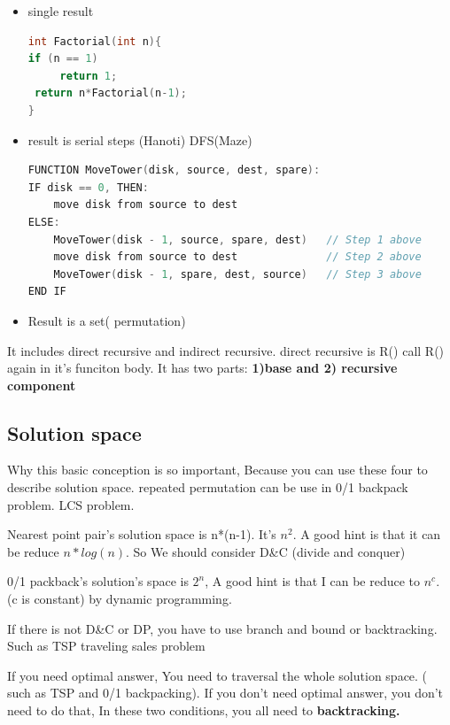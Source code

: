 \documentclass[a4paper,11pt,twoside]{book}
\begin{document}
\begin{itemize}
\item single result 
\begin{lstlisting}[frame=single, language=c++]
int Factorial(int n){
if (n == 1) 
     return 1;
 return n*Factorial(n-1);
}
\end{lstlisting}

	\item result is serial steps (Hanoti) DFS(Maze)
\begin{lstlisting}[frame=single, language=c++]
FUNCTION MoveTower(disk, source, dest, spare):
IF disk == 0, THEN:
    move disk from source to dest
ELSE:
    MoveTower(disk - 1, source, spare, dest)   // Step 1 above
    move disk from source to dest              // Step 2 above
    MoveTower(disk - 1, spare, dest, source)   // Step 3 above
END IF
\end{lstlisting}

	\item  Result is a set( permutation)

\end{itemize}

	\par It includes direct recursive and indirect recursive. direct recursive is R() call R() again in it's funciton body. It has two parts: \textbf{1)base and 2) recursive component}


\subsection{Solution space }

\par Why this basic conception is so important, Because you can use these four to describe solution space. repeated permutation can be use in 0/1 backpack problem.  LCS problem.  

\par Nearest point pair's solution space is n*(n-1). It's $n^2$. A good hint is that it can be reduce $n*log(n)$. So We should consider D\&C (divide and conquer)

\par 0/1 packback's solution's space is $2^n$, A good hint is that I can be reduce to $n^c$. (c is constant) by dynamic programming. 

\par If there is not D\&C or DP, you have to use branch and bound or backtracking. Such as TSP traveling sales problem

\par If you need optimal answer, You need to traversal the whole solution space. ( such as TSP and 0/1 backpacking). If you don't need optimal answer, you don't need to do that, In these two conditions, you all need to \textbf{backtracking.}
\end{document}
